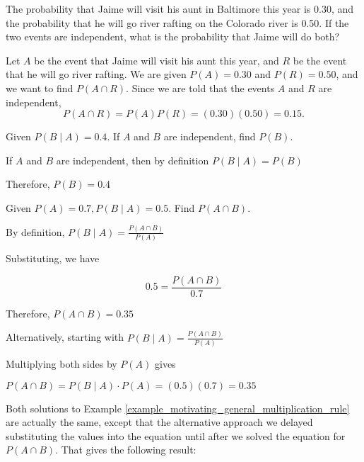 \begin{example}
    The probability that Jaime will visit his aunt in Baltimore this year is 0.30, and the probability that he will go river rafting on the Colorado river is 0.50. If the two events are independent, what is the probability that Jaime will do both?
\end{example}

\begin{solution}
    Let \( A \) be the event that Jaime will visit his aunt this year, and \( R \) be the event that he will go river rafting. We are given \( P(A) = 0.30 \) and \( P(R) = 0.50 \), and we want to find \( P(A \cap R) \). Since we are told that the events \( A \) and \( R \) are independent,
    \[ P(A \cap R) = P(A)P(R) = (0.30)(0.50) = 0.15. \]
\end{solution}


\begin{example}
    Given \( P(B \mid A) = 0.4 \). If \( A \) and \( B \) are independent, find \( P(B) \).
\end{example}

\begin{solution}
    If \( A \) and \( B \) are independent, then by definition \( P(B \mid A) = P(B) \)

    Therefore, \( P(B) = 0.4 \)
\end{solution}

\begin{example}\label{example_motivating_general_multiplication_rule}
    Given \( P(A) = 0.7, P(B \mid A) = 0.5 \). Find \( P(A \cap B) \).
\end{example}

\begin{solution}
    By definition, \( P(B \mid A) = \frac{P(A \cap B)}{P(A)} \)

    Substituting, we have

    \[
        0.5 = \frac{P(A \cap B)}{0.7}
    \]

    Therefore, \( P(A \cap B) = 0.35 \)

    Alternatively, starting with \( P(B \mid A) = \frac{P(A \cap B)}{P(A)} \)

    Multiplying both sides by \( P(A) \) gives

    \( P(A \cap B) = P(B \mid A) \cdot P(A) = (0.5)(0.7) = 0.35 \)
\end{solution}

Both solutions to Example \ref{example_motivating_general_multiplication_rule} are actually the same, except that the alternative approach we delayed substituting the values into the equation until after we solved the equation for \( P(A\cap B) \).  That gives the following result:

